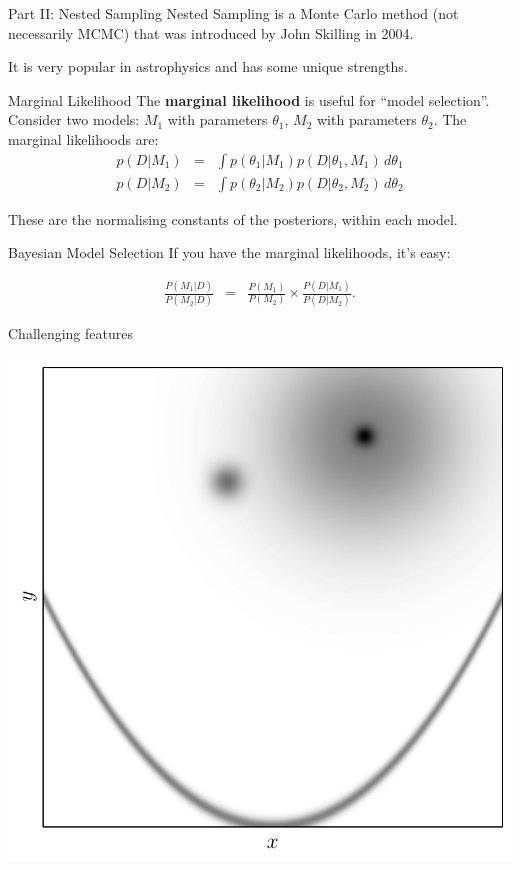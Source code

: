 \begin{frame}[t]{Part II: Nested Sampling}
Nested Sampling is a Monte Carlo method (not necessarily MCMC) that was
introduced by John Skilling in 2004.

It is very popular in astrophysics and has some unique strengths.
\end{frame}


\begin{frame}[t]{Marginal Likelihood}
The {\bf marginal likelihood} is useful for ``model selection''. Consider
two models: $M_1$ with parameters $\theta_1$, $M_2$ with parameters $\theta_2$.
The marginal likelihoods are:
\begin{eqnarray*}
p(D | M_1) &=& \int p(\theta_1 | M_1) p(D | \theta_1, M_1) \, d\theta_1\\
p(D | M_2) &=& \int p(\theta_2 | M_2) p(D | \theta_2, M_2) \, d\theta_2
\end{eqnarray*}

These are the normalising constants of the posteriors, within each model.
\end{frame}



\begin{frame}[t]{Bayesian Model Selection}
If you have the marginal likelihoods, it's easy:

\begin{eqnarray*}
\frac{P(M_1 | D)}{P(M_2 | D)} &=& \frac{P(M_1)}{P(M_2)}
\times \frac{P(D | M_1)}{P(D | M_2)}.
\end{eqnarray*}
\end{frame}


\begin{frame}[t]{Challenging features}
\begin{center}
\includegraphics[scale=0.4]{challenges.pdf}
\end{center}
\end{frame}

